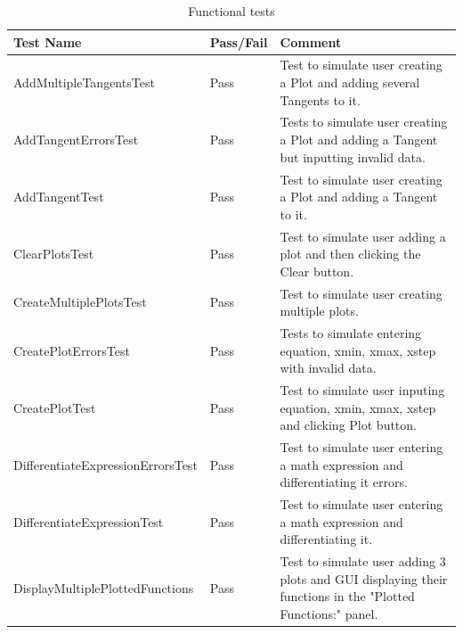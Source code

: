 \documentclass[a4paper, oneside, 11pt]{report}
\begin{document}
\begin{table}[H]
\caption{Functional tests}
\label{test:functional}
\resizebox{\textwidth}{!}
{%
\begin{tabular}{|l|l|l|}
\hline
\textbf{Test Name}                       & \textbf{Pass/Fail} & \textbf{Comment}                                                                                           \\ \hline
AddMultipleTangentsTest                  & Pass               & Test to simulate user creating a Plot and adding several Tangents to it.                                   \\ \hline
AddTangentErrorsTest                     & Pass               & Tests to simulate user creating a Plot and adding a Tangent but inputting invalid data.                    \\ \hline
AddTangentTest                           & Pass               & Test to simulate user creating a Plot and adding a Tangent to it.                                          \\ \hline
ClearPlotsTest                           & Pass               & Test to simulate user adding a plot and then clicking the Clear button.                                    \\ \hline
CreateMultiplePlotsTest                  & Pass               & Test to simulate user creating multiple plots.                                                             \\ \hline
CreatePlotErrorsTest                     & Pass               & Tests to simulate entering equation, xmin, xmax, xstep with invalid data.                                  \\ \hline
CreatePlotTest                           & Pass               & Test to simulate user inputing equation, xmin, xmax, xstep and clicking Plot button.                       \\ \hline
DifferentiateExpressionErrorsTest        & Pass               & Test to simulate user entering a math expression and differentiating it errors.                            \\ \hline
DifferentiateExpressionTest              & Pass               & Test to simulate user entering a math expression and differentiating it.                                   \\ \hline
DisplayMultiplePlottedFunctions          & Pass               & Test to simulate user adding 3 plots and GUI displaying their functions in the "Plotted Functions:" panel. \\ \hline

\end{tabular}}
\end{table}
\end{document}
